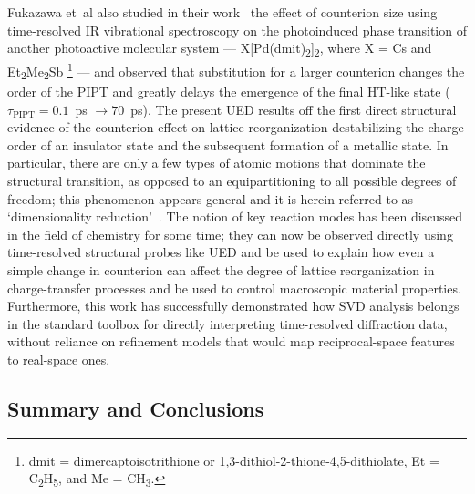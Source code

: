 Fukazawa et~al also studied in their work~\cite{Fukazawa2013} the effect of counterion size
using time-resolved IR vibrational spectroscopy on the photoinduced phase transition of
another photoactive molecular system --- X[Pd(dmit)\textsubscript{2}]\textsubscript{2},
where X =  Cs and Et\textsubscript{2}Me\textsubscript{2}Sb%
\footnote{dmit = dimercaptoisotrithione or 1,3-dithiol-2-thione-4,5-dithiolate,
Et = C\textsubscript{2}H\textsubscript{5}, and Me = CH\textsubscript{3}.} ---
and observed that substitution for a larger counterion changes the order of the PIPT and
greatly delays the emergence of the final HT-like state
($\tau_\text{PIPT} = 0.1$~ps $\rightarrow 70$~ps).
%
The present UED results off the first direct structural evidence of the counterion effect
on lattice reorganization destabilizing the charge order of an insulator state and
the subsequent formation of a metallic state.
In particular, there are only a few types of atomic motions that dominate the structural transition,
as opposed to an equipartitioning to all possible degrees of freedom;
this phenomenon appears general and it is herein referred to as `dimensionality reduction'~\cite{Miller2016}.
The notion of key reaction modes has been discussed in the field of chemistry for some time;
they can now be observed directly using time-resolved structural probes like UED and
be used to explain how even a simple change in counterion can affect
the degree of lattice reorganization in charge-transfer processes and
be used to control macroscopic material properties.
%
Furthermore, this work has successfully demonstrated how SVD analysis belongs in the standard toolbox
for directly interpreting time-resolved diffraction data, without reliance on refinement models
that would map reciprocal-space features to real-space ones.

\subsection{Summary and Conclusions}

